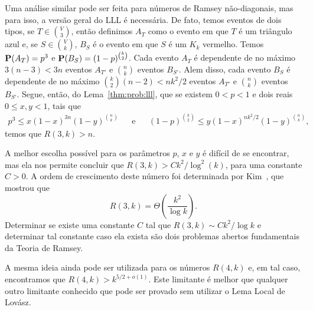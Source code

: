 Uma análise similar pode ser feita para números de Ramsey não-diagonais, mas para isso, a versão geral do LLL é necessária. De fato, temos eventos de dois tipos, se $T \in \binom{V}{3}$, então definimos $A_T$ como o evento em que $T$ é um triângulo azul e, se $S \in \binom{V}{k}$, $B_S$ é o evento em que $S$ é um $K_k$ vermelho.
Temos $\operatorname{\mathbf{P}}(A_T) = p^3$ e $\operatorname{\mathbf{P}}(B_S) = (1-p)^{\binom{k}{2}}$.
Cada evento $A_T$ é dependente de no máximo $3(n-3) < 3n$ eventos $A_{T'}$ e $\binom{n}{k}$ eventos $B_{S'}$. Alem disso, cada evento $B_S$ é dependente de no máximo $\binom{k}{2}(n-2) < nk^2/2$ eventos $A_{T'}$ e $\binom{n}{k}$ eventos $B_{S'}$.
Segue, então, do Lema~\ref{thm:prob:lll}, que se existem $0 < p < 1$ e dois reais $0 \leq x,y < 1$, tais que
\begin{align*} p^3 \leq x(1-x)^{3n}(1-y)^{\binom{n}{k}} && \text{e} &&
(1-p)^{\binom{k}{2}} \leq y(1-x)^{nk^2/2}(1-y)^{\binom{n}{k}},
\end{align*}
temos que $R(3,k) > n$.

A melhor escolha possível para os parâmetros $p$, $x$ e $y$ é difícil de se encontrar, mas ela nos permite concluir que $R(3,k) > Ck^2/\log^2(k)$, para uma constante $C > 0$. A ordem de crescimento deste número foi determinada por Kim~\cite{kim1995ramsey}, que mostrou que
\[ R(3,k) = \Theta\left( \frac{k^2}{\log k}\right). \]
Determinar se existe uma constante $C$ tal que $R(3,k) \sim Ck^2 / \log k$ e determinar tal constante caso ela exista são dois problemas abertos fundamentais da Teoria de Ramsey.

A mesma ideia ainda pode ser utilizada para os números $R(4,k)$ e, em tal caso, encontramos que $R(4,k) > k^{5/2 + o(1)}$. Este limitante é melhor que qualquer outro limitante conhecido que pode ser provado sem utilizar o Lema Local de Lovász.

